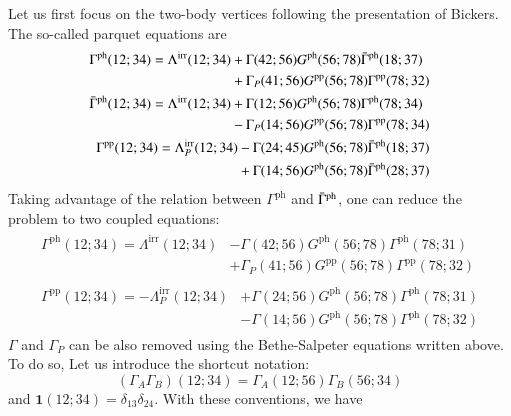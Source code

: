 \documentclass[aip,jcp,reprint,noshowkeys,superscriptaddress]{revtex4-1}
\newcommand{\bI}{\boldsymbol{1}}
\newcommand{\ph}{\text{ph}}
\newcommand{\pp}{\text{pp}}
\newcommand{\irr}{\text{irr}}
\begin{document}
Let us first focus on the two-body vertices following the presentation of Bickers. \cite{Bickers_2004}
The so-called parquet equations are
\begin{align}
	\begin{split}
    	\Gamma^\ph(12;34) 
    	= \Lambda^\irr(12;34) 
    	& + \Gamma(42;56) G^\ph(56;78)\Bar{\Gamma}^\ph(18;37)
    	\\
    	& + \Gamma_P(41;56) G^\pp(56;78)\Gamma^\pp(78;32)
	\end{split}
	\\
	\begin{split}
    	\Bar{\Gamma}^\ph(12;34) 
    	= \Lambda^\irr(12;34) 
    	& + \Gamma(12;56) G^\ph(56;78)\Gamma^\ph(78;34)
    	\\
    	& - \Gamma_P(14;56) G^\pp(56;78)\Gamma^\pp(78;34)
	\end{split}
	\\
	\begin{split}
    	\Gamma^\pp(12;34) 
    	= \Lambda_P^\irr(12;34) 
    	& - \Gamma(24;45) G^\ph(56;78)\Bar{\Gamma}^\ph(18;37)
    	\\
    	& + \Gamma(14;56) G^\ph(56;78)\Bar{\Gamma}^\ph(28;37)
	\end{split}
\end{align}
Taking advantage of the relation between $\Gamma^\ph$ and $\Bar{\Gamma}^\ph$, one can reduce the problem to two coupled equations:
\begin{align}
	\begin{split}
    	\Gamma^\ph(12;34) 
    	= \Lambda^\irr(12;34) 
    	& - \Gamma(42;56) G^\ph(56;78)\Gamma^\ph(78;31)
    	\\
    	& + \Gamma_P(41;56) G^\pp(56;78)\Gamma^\pp(78;32)
	\end{split}
	\\
	\begin{split}
    	\Gamma^\pp(12;34) 
    	= - \Lambda_P^\irr(12;34) 
    	& + \Gamma(24;56) G^\ph(56;78)\Gamma^\ph(78;31)
    	\\
    	& - \Gamma(14;56) G^\ph(56;78)\Gamma^\ph(78;32)
	\end{split}
\end{align}
$\Gamma$ and $\Gamma_P$ can be also removed using the Bethe-Salpeter equations written above.
To do so, Let us introduce the shortcut notation:
\begin{equation}
	(\Gamma_A \Gamma_B)(12;34) = \Gamma_A(12;56) \Gamma_B(56;34)
\end{equation}
and $\bI(12;34) = \delta_{13} \delta_{24}$.
With these conventions, we have
\end{document}
